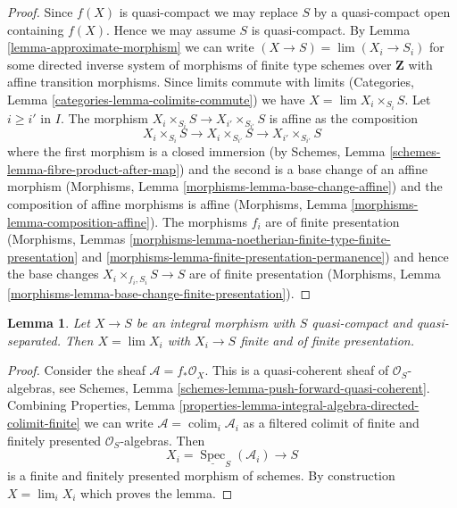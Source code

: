 \documentclass{stacks-project}
\theoremstyle{plain}
\newtheorem{lemma}[subsection]{Lemma}
\theoremstyle{definition}
\theoremstyle{remark}
\numberwithin{equation}{subsection}
\def\lim{\mathop{\mathrm{lim}}\nolimits}
\def\colim{\mathop{\mathrm{colim}}\nolimits}
\def\Spec{\mathop{\mathrm{Spec}}}
\begin{document}
\begin{proof}
Since $f(X)$ is quasi-compact we may replace $S$ by a quasi-compact
open containing $f(X)$. Hence we may assume $S$ is quasi-compact.
By Lemma \ref{lemma-approximate-morphism} we can write
$(X \to S) = \lim (X_i \to S_i)$ for some directed inverse system
of morphisms of finite type schemes over $\mathbf{Z}$ with
affine transition morphisms. Since limits commute with limits
(Categories, Lemma \ref{categories-lemma-colimits-commute})
we have $X = \lim X_i \times_{S_i} S$.
Let $i \geq i'$ in $I$. The morphism
$X_i \times_{S_i} S \to X_{i'} \times_{S_{i'}} S$
is affine as the composition
$$
X_i \times_{S_i} S \to X_i \times_{S_{i'}} S \to X_{i'} \times_{S_{i'}} S
$$
where the first morphism is a closed immersion (by
Schemes, Lemma \ref{schemes-lemma-fibre-product-after-map})
and the second is a base change of an affine morphism
(Morphisms, Lemma \ref{morphisms-lemma-base-change-affine})
and the composition of affine morphisms is affine
(Morphisms, Lemma \ref{morphisms-lemma-composition-affine}).
The morphisms $f_i$ are of finite presentation
(Morphisms, Lemmas
\ref{morphisms-lemma-noetherian-finite-type-finite-presentation} and
\ref{morphisms-lemma-finite-presentation-permanence})
and hence the base changes $X_i \times_{f_i, S_i} S \to S$
are of finite presentation
(Morphisms, Lemma \ref{morphisms-lemma-base-change-finite-presentation}).
\end{proof}

\begin{lemma}
\label{lemma-integral-limit-finite-and-finite-presentation}
Let $X \to S$ be an integral morphism with $S$ quasi-compact and
quasi-separated. Then $X = \lim X_i$ with $X_i \to S$ finite and
of finite presentation.
\end{lemma}

\begin{proof}
Consider the sheaf $\mathcal{A} = f_*\mathcal{O}_X$.
This is a quasi-coherent sheaf of $\mathcal{O}_S$-algebras, see
Schemes, Lemma \ref{schemes-lemma-push-forward-quasi-coherent}.
Combining
Properties, Lemma
\ref{properties-lemma-integral-algebra-directed-colimit-finite}
we can write $\mathcal{A} = \colim_i \mathcal{A}_i$ as a filtered
colimit of finite and finitely presented $\mathcal{O}_S$-algebras.
Then
$$
X_i = \underline{\Spec}_S(\mathcal{A}_i)
\longrightarrow
S
$$
is a finite and finitely presented morphism of schemes. By construction
$X = \lim_i X_i$ which proves the lemma.
\end{proof}
\end{document}
